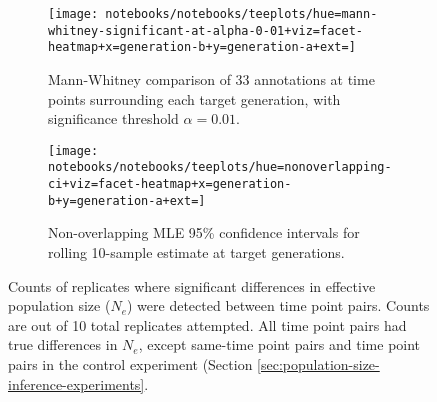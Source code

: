 \begin{figure}
  \centering

  \begin{subfigure}{\textwidth}
    \begin{minipage}{0.7\textwidth}
      \texttt{[image: notebooks/notebooks/teeplots/hue=mann-whitney-significant-at-alpha-0-01+viz=facet-heatmap+x=generation-b+y=generation-a+ext=]}
    \end{minipage}%
    \begin{minipage}{0.25\textwidth}
      \caption{Mann-Whitney comparison of 33 annotations at time points surrounding each target generation, with significance threshold $\alpha = 0.01$.}
      \label{fig:ne-detection-matrix:mann-whitney}
    \end{minipage}
  \end{subfigure}

  \vspace{1em} %

  \begin{subfigure}{\textwidth}
    \begin{minipage}{0.7\textwidth}
      \texttt{[image: notebooks/notebooks/teeplots/hue=nonoverlapping-ci+viz=facet-heatmap+x=generation-b+y=generation-a+ext=]}
    \end{minipage}%
    \begin{minipage}{0.25\textwidth}
      \caption{Non-overlapping MLE 95\% confidence intervals for rolling 10-sample estimate at target generations.}
      \label{fig:ne-detection-matrix:ci}
    \end{minipage}
  \end{subfigure}

  \caption{Counts of replicates where significant differences in effective population size ($N_e$) were detected between time point pairs.
  Counts are out of 10 total replicates attempted.
  All time point pairs had true differences in $N_e$, except same-time point pairs and time point pairs in the control experiment (Section \ref{sec:population-size-inference-experiments}.
  }
  \label{fig:ne-detection-matrix}
\end{figure}

%
